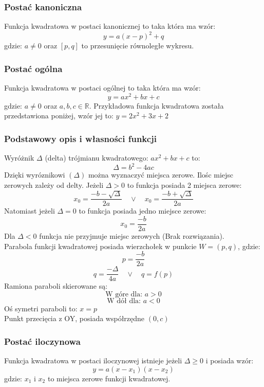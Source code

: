 \documentclass[12pt, a4paper]{article}
\begin{document}
\subsubsection*{Postać kanoniczna}
Funkcja kwadratowa w postaci kanonicznej to taka która ma wzór:
$$y = a(x - p)^2 + q$$
gdzie: $a \neq 0$ oraz $[p, q]$ to przesunięcie równoległe wykresu.

\subsubsection*{Postać ogólna}
Funkcja kwadratowa w postaci ogólnej to taka która ma wzór:
$$y = ax^2 + bx + c$$
gdzie: $a \neq 0$ oraz $a, b, c \in \mathbb{R}$. Przykładowa funkcja kwadratowa została przedstawiona
poniżej, wzór jej to: $y = 2x^2 + 3x + 2$
\begin{center}
\end{center}
\subsubsection*{Podstawowy opis i własności funkcji}
Wyróżnik $\Delta$ (delta) trójmianu kwadratowego: $ax^2 + bx + c$ to:
$$\Delta = b^2 - 4ac$$
Dzięki wyróznikowi $(\Delta)$ można wyznaczyć miejsca zerowe. Ilośc miejsc zerowych zależy od delty.
Jeżeli $\Delta > 0$ to funkcja posiada 2 miejsca zerowe:
$$x_0 = \frac{-b - \sqrt{\Delta}}{2a}\quad\vee\quad x_0=\frac{-b + \sqrt{\Delta}}{2a}$$
Natomiast jeżeli $\Delta = 0$ to funkcja posiada jedno miejsce zerowe:
$$x_0 = \frac{-b}{2a}$$
Dla $\Delta < 0$ funkcja nie przyjmuje miejsc zerowych (Brak rozwiązania). \\
Parabola funkcji kwadratowej posiada wierzchołek w punkcie $W=(p, q)$, gdzie:
$$p = \frac{-b}{2a}$$
$$q = \frac{-\Delta}{4a}\quad\vee\quad q = f(p)$$
Ramiona paraboli skierowane są:
$$\text{W góre dla: } a > 0$$
$$\text{W dół dla: } a < 0$$
Oś symetri paraboli to: $x = p$ \\
Punkt przecięcia z OY, posiada współrzędne $\left(0, c\right)$
\subsubsection*{Postać iloczynowa}
Funkcja kwadratowa w postaci iloczynowej istnieje jeżeli $\Delta \geq 0$ i posiada wzór:
$$y = a\left(x - x_1\right)\left(x - x_2\right)$$
gdzie: $x_1$ i $x_2$ to miejsca zerowe funkcji kwadratowej.
\end{document}
